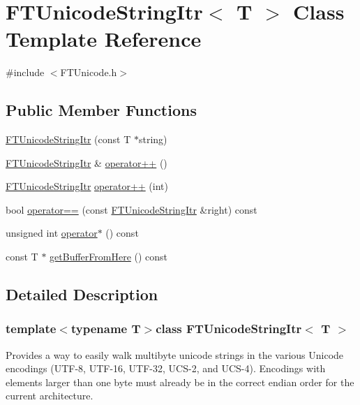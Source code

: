 \hypertarget{class_f_t_unicode_string_itr}{\section{F\-T\-Unicode\-String\-Itr$<$ T $>$ Class Template Reference}
\label{class_f_t_unicode_string_itr}
}


{\ttfamily \#include $<$F\-T\-Unicode.\-h$>$}

\subsection*{Public Member Functions}
\begin{DoxyCompactItemize}
\item 
\hyperlink{class_f_t_unicode_string_itr_ab640405eaa904f1609f1b659e5657989}{F\-T\-Unicode\-String\-Itr} (const T $\ast$string)
\item 
\hyperlink{class_f_t_unicode_string_itr}{F\-T\-Unicode\-String\-Itr} \& \hyperlink{class_f_t_unicode_string_itr_a476aa8e48d5ea56de9ee979af1cd4007}{operator++} ()
\item 
\hyperlink{class_f_t_unicode_string_itr}{F\-T\-Unicode\-String\-Itr} \hyperlink{class_f_t_unicode_string_itr_a84c9354998144c4f221cde699e3f8455}{operator++} (int)
\item 
bool \hyperlink{class_f_t_unicode_string_itr_ae27e7162e014fbcbf731a50bd34b2946}{operator==} (const \hyperlink{class_f_t_unicode_string_itr}{F\-T\-Unicode\-String\-Itr} \&right) const 
\item 
unsigned int \hyperlink{class_f_t_unicode_string_itr_a90300d6888d77e7a349b0d476a7c0bb4}{operator$\ast$} () const 
\item 
const T $\ast$ \hyperlink{class_f_t_unicode_string_itr_a8ced99f40fd1af46e0a76b844187efe1}{get\-Buffer\-From\-Here} () const 
\end{DoxyCompactItemize}


\subsection{Detailed Description}
\subsubsection*{template$<$typename T$>$class F\-T\-Unicode\-String\-Itr$<$ T $>$}

Provides a way to easily walk multibyte unicode strings in the various Unicode encodings (U\-T\-F-\/8, U\-T\-F-\/16, U\-T\-F-\/32, U\-C\-S-\/2, and U\-C\-S-\/4). Encodings with elements larger than one byte must already be in the correct endian order for the current architecture. 

